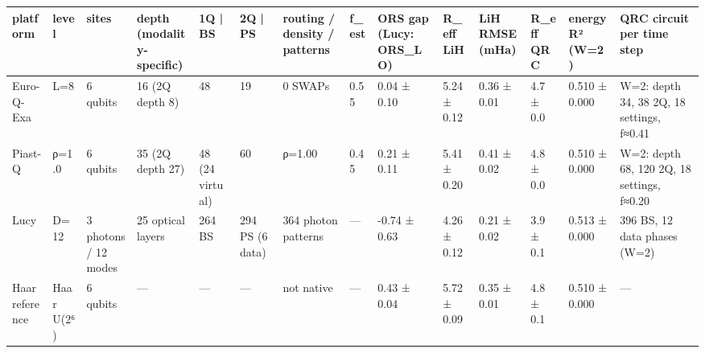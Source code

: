 \begin{tabular}{llllllllllllll}
\toprule
platform & level & sites & depth (modality-specific) & 1Q | BS & 2Q | PS & routing / density / patterns & f\_est & ORS gap (Lucy: ORS\_LO) & R\_eff LiH & LiH RMSE (mHa) & R\_eff QRC & energy R² (W=2) & QRC circuit per time step \\
\midrule
Euro-Q-Exa & L=8 & 6 qubits & 16 (2Q depth 8) & 48 & 19 & 0 SWAPs & 0.55 & 0.04 ± 0.10 & 5.24 ± 0.12 & 0.36 ± 0.01 & 4.7 ± 0.0 & 0.510 ± 0.000 & W=2: depth 34, 38 2Q, 18 settings, f≈0.41 \\
Piast-Q & ρ=1.0 & 6 qubits & 35 (2Q depth 27) & 48 (24 virtual) & 60 & ρ=1.00 & 0.45 & 0.21 ± 0.11 & 5.41 ± 0.20 & 0.41 ± 0.02 & 4.8 ± 0.0 & 0.510 ± 0.000 & W=2: depth 68, 120 2Q, 18 settings, f≈0.20 \\
Lucy & D=12 & 3 photons / 12 modes & 25 optical layers & 264 BS & 294 PS (6 data) & 364 photon patterns & — & -0.74 ± 0.63 & 4.26 ± 0.12 & 0.21 ± 0.02 & 3.9 ± 0.1 & 0.513 ± 0.000 & 396 BS, 12 data phases (W=2) \\
Haar reference & Haar U(2⁶) & 6 qubits & — & — & — & not native & — & 0.43 ± 0.04 & 5.72 ± 0.09 & 0.35 ± 0.01 & 4.8 ± 0.1 & 0.510 ± 0.000 & — \\
\bottomrule
\end{tabular}
